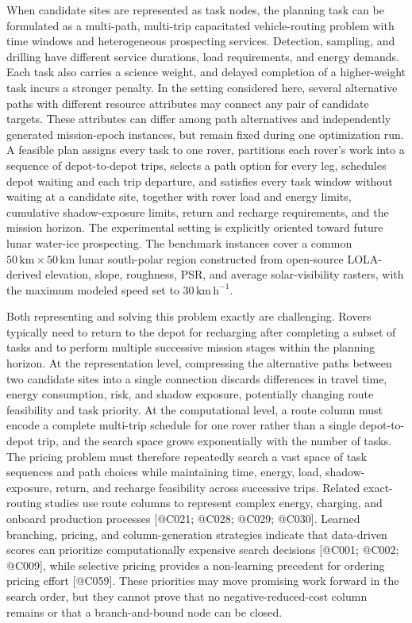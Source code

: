 \documentclass[
  11pt,
]{article}
\begin{document}
When candidate sites are represented as task nodes, the planning task
can be formulated as a multi-path, multi-trip capacitated
vehicle-routing problem with time windows and heterogeneous prospecting
services. Detection, sampling, and drilling have different service
durations, load requirements, and energy demands. Each task also carries
a science weight, and delayed completion of a higher-weight task incurs
a stronger penalty. In the setting considered here, several alternative
paths with different resource attributes may connect any pair of
candidate targets. These attributes can differ among path alternatives
and independently generated mission-epoch instances, but remain fixed
during one optimization run. A feasible plan assigns every task to one
rover, partitions each rover's work into a sequence of depot-to-depot
trips, selects a path option for every leg, schedules depot waiting and
each trip departure, and satisfies every task window without waiting at
a candidate site, together with rover load and energy limits, cumulative
shadow-exposure limits, return and recharge requirements, and the
mission horizon. The experimental setting is explicitly oriented toward
future lunar water-ice prospecting. The benchmark instances cover a
common \(50\,\mathrm{km}\times50\,\mathrm{km}\) lunar south-polar region
constructed from open-source LOLA-derived elevation, slope, roughness,
PSR, and average solar-visibility rasters, with the maximum modeled
speed set to \(30\,\mathrm{km\,h^{-1}}\).

Both representing and solving this problem exactly are challenging.
Rovers typically need to return to the depot for recharging after
completing a subset of tasks and to perform multiple successive mission
stages within the planning horizon. At the representation level,
compressing the alternative paths between two candidate sites into a
single connection discards differences in travel time, energy
consumption, risk, and shadow exposure, potentially changing route
feasibility and task priority. At the computational level, a route
column must encode a complete multi-trip schedule for one rover rather
than a single depot-to-depot trip, and the search space grows
exponentially with the number of tasks. The pricing problem must
therefore repeatedly search a vast space of task sequences and path
choices while maintaining time, energy, load, shadow-exposure, return,
and recharge feasibility across successive trips. Related exact-routing
studies use route columns to represent complex energy, charging, and
onboard production processes {[}@C021; @C028; @C029; @C030{]}. Learned
branching, pricing, and column-generation strategies indicate that
data-driven scores can prioritize computationally expensive search
decisions {[}@C001; @C002; @C009{]}, while selective pricing provides a
non-learning precedent for ordering pricing effort {[}@C059{]}. These
priorities may move promising work forward in the search order, but they
cannot prove that no negative-reduced-cost column remains or that a
branch-and-bound node can be closed.
\end{document}
